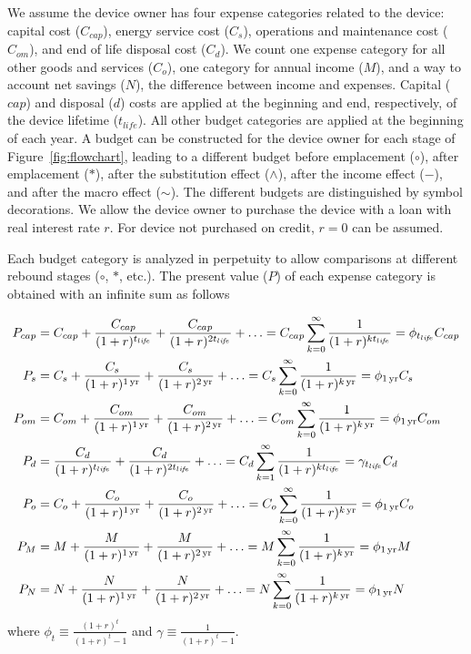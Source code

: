 
We assume the device owner has four expense categories 
related to the device:
capital cost ($C_{cap}$), 
energy service cost ($C_s$), 
operations and maintenance cost ($C_{om}$), and
end of life disposal cost ($C_d$).
We count one expense category for all other
goods and services ($C_o$),
one category for annual income ($M$), and 
a way to account net savings ($N$), 
the difference between income and expenses.
Capital ($cap$) and disposal ($d$) costs are applied
at the beginning and end, respectively, 
of the device lifetime ($t_{life}$).
All other budget categories are 
applied at the beginning of each year.
A budget can be constructed for the device owner for each stage
of Figure~\ref{fig:flowchart}, 
leading to a different budget 
before emplacement ($\circ$), 
after emplacement ($*$), 
after the substitution effect ($\wedge$), 
after the income effect ($-$), and 
after the macro effect ($\sim$).
The different budgets are distinguished by symbol decorations.
We allow the device owner to purchase the device 
with a loan with real interest rate $r$.
For device not purchased on credit,
$r = 0$ can be assumed.

Each budget category is analyzed in perpetuity
to allow comparisons at different rebound stages 
($\circ$, $*$, etc.).
The present value ($P$) of each expense category is obtained
with an infinite sum as follows

\begin{align} \label{eq:present_values}
  P_{cap} &= C_{cap} + \frac{C_{cap}}{(1 + r)^{\tlife}} + \frac{C_{cap}}{(1 + r)^{2 \tlife}} + \ldots 
  = C_{cap} \sum_{k = 0}^{\infty} \frac{1}{(1 + r)^{k \tlife}} 
  = \phi_{\tlife} C_{cap} \\
%
  P_s &= C_s + \frac{C_s}{(1 + r)^{\oneyr}} + \frac{C_s}{(1 + r)^{\twoyr}} + \ldots
  = C_s \sum_{k = 0}^{\infty} \frac{1}{(1 + r)^{\kyr}}
  = \phi_{\oneyr} C_s \\
%
  P_{om} &= C_{om} + \frac{C_{om}}{(1 + r)^{\oneyr}} +  \frac{C_{om}}{(1 + r)^{\twoyr}} + \ldots
  = C_{om} \sum_{k = 0}^{\infty} \frac{1}{(1 + r)^{\kyr}}
  = \phi_{\oneyr} C_{om} \\
%
  P_d &= \frac{C_d}{(1 + r)^{\tlife}} + \frac{C_d}{(1 + r)^{2 \tlife}} + \ldots 
  = C_d \sum_{k = 1}^{\infty} \frac{1}{(1 + r)^{k \tlife}} 
  = \gamma_{\tlife} C_d \\
%
  P_o &= C_o + \frac{C_o}{(1 + r)^{\oneyr}} + \frac{C_o}{(1 + r)^{\twoyr}} + \ldots
  = C_o \sum_{k = 0}^{\infty} \frac{1}{(1 + r)^{\kyr}}
  = \phi_{\oneyr} C_o \\
%
  P_M &= M + \frac{M}{(1 + r)^{\oneyr}} + \frac{M}{(1 + r)^{\twoyr}} + \ldots
  = M \sum_{k = 0}^{\infty} \frac{1}{(1 + r)^{\kyr}}
  = \phi_{\oneyr} M \\
%
  P_N &= N + \frac{N}{(1 + r)^{\oneyr}} + \frac{N}{(1 + r)^{\twoyr}} + \ldots
  = N \sum_{k = 0}^{\infty} \frac{1}{(1 + r)^{\kyr}}
  = \phi_{\oneyr} N
\end{align}
%
where $\phi_t \equiv \frac{(1 + r)^t}{(1 + r)^t - 1}$
and $\gamma \equiv \frac{1}{(1 + r)^t - 1}$.

